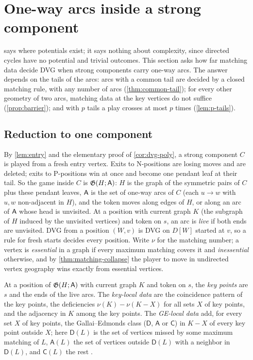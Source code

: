 \section{One-way arcs inside a strong component}\label{sec:oneway}

 says where potentials exist; it says nothing about complexity, since directed cycles have no potential and trivial outcomes. This section asks how far matching data decide DVG when strong components carry one-way arcs. The answer depends on the tails of the arcs: arcs with a common tail are decided by a closed matching rule, with any number of arcs (\cref{thm:common-tail}); for every other geometry of two arcs, matching data at the key vertices do not suffice (\cref{prop:barrier}); and with $p$ tails a play crosses at most $p$ times (\cref{lem:p-tails}).

\subsection{Reduction to one component}\label{ssec:oneway-reduction}
By \cref{lem:entry} and the elementary proof of \cref{cor:dvg-poly}, a strong component $C$ is played from a fresh entry vertex. Exits to N-positions are losing moves and are deleted; exits to P-positions win at once and become one pendant leaf at their tail. So the game inside $C$ is $\mathfrak{G}(H;\mathsf{A})$: $H$ is the graph of the symmetric pairs of $C$ plus these pendant leaves, $\mathsf{A}$ is the set of one-way arcs of $C$ (each $u\to w$ with $u,w$ non-adjacent in $H$), and the token moves along edges of $H$, or along an arc of $\mathsf{A}$ whose head is unvisited. At a position with current graph $K$ (the subgraph of $H$ induced by the unvisited vertices) and token on $s$, an arc is \emph{live} if both ends are unvisited. DVG from a position $(W,v)$ is DVG on $D[W]$ started at $v$, so a rule for fresh starts decides every position. Write $\nu$ for the matching number; a vertex is \emph{essential} in a graph if every maximum matching covers it and \emph{inessential} otherwise, and by \cref{thm:matching-collapse} the player to move in undirected vertex geography wins exactly from essential vertices.

\begin{definition}\label{def:key-local}
At a position of $\mathfrak{G}(H;\mathsf{A})$ with current graph $K$ and token on $s$, the \emph{key points} are $s$ and the ends of the live arcs. The \emph{key-local data} are the coincidence pattern of the key points, the deficiencies $\nu(K)-\nu(K-X)$ for all sets $X$ of key points, and the adjacency in $K$ among the key points. The \emph{GE-local data} add, for every set $X$ of key points, the Gallai--Edmonds class ($\mathsf D$, $\mathsf A$ or $\mathsf C$) in $K-X$ of every key point outside $X$; here $\mathsf D(L)$ is the set of vertices missed by some maximum matching of $L$, $\mathsf A(L)$ the set of vertices outside $\mathsf D(L)$ with a neighbor in $\mathsf D(L)$, and $\mathsf C(L)$ the rest \cite{LovaszPlummer}.
\end{definition}

